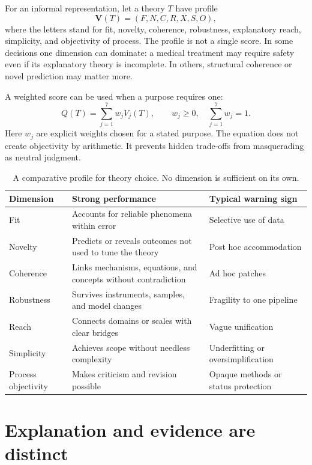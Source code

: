 For an informal representation, let a theory \(T\) have profile
\[
  \mathbf{V}(T) =
  (F,N,C,R,X,S,O),
\]
where the letters stand for fit, novelty, coherence, robustness, explanatory
reach, simplicity, and objectivity of process. The profile is not a single
score. In some decisions one dimension can dominate: a medical treatment may
require safety even if its explanatory theory is incomplete. In others,
structural coherence or novel prediction may matter more.

A weighted score can be used when a purpose requires one:
\[
  Q(T) = \sum_{j=1}^{7} w_j V_j(T),
  \qquad
  w_j \geq 0,\quad \sum_{j=1}^{7}w_j=1.
\]
Here \(w_j\) are explicit weights chosen for a stated purpose. The equation
does not create objectivity by arithmetic. It prevents hidden trade-offs from
masquerading as neutral judgment.

\begin{table}[ht]
\centering
\smalltable
\begin{tabularx}{\textwidth}{p{}Y Y}
\toprule
Dimension & Strong performance & Typical warning sign\\
\midrule
Fit & Accounts for reliable phenomena within error & Selective use of data\\
Novelty & Predicts or reveals outcomes not used to tune the theory & Post hoc accommodation\\
Coherence & Links mechanisms, equations, and concepts without contradiction & Ad hoc patches\\
Robustness & Survives instruments, samples, and model changes & Fragility to one pipeline\\
Reach & Connects domains or scales with clear bridges & Vague unification\\
Simplicity & Achieves scope without needless complexity & Underfitting or oversimplification\\
Process objectivity & Makes criticism and revision possible & Opaque methods or status protection\\
\bottomrule
\end{tabularx}
\caption{A comparative profile for theory choice. No dimension is sufficient on
its own.}
\label{tab:theory-profile}
\end{table}

\section{Explanation and evidence are distinct}

